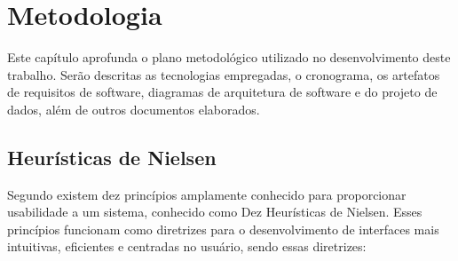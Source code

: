 \chapter{Metodologia}
\label{cap:metodologia}

Este capítulo aprofunda o plano metodológico utilizado no desenvolvimento deste trabalho. Serão descritas as tecnologias empregadas, o cronograma, os artefatos de requisitos de software, diagramas de arquitetura de software e do projeto de dados, além de outros documentos elaborados.

\section{Heurísticas de Nielsen}

Segundo  existem dez princípios amplamente conhecido para proporcionar usabilidade a um sistema, conhecido como Dez Heurísticas de Nielsen. Esses princípios funcionam como diretrizes para o desenvolvimento de interfaces mais intuitivas, eficientes e centradas no usuário, sendo essas diretrizes:

